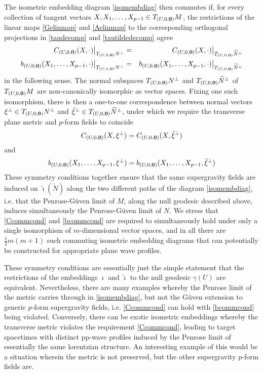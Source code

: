 The isometric embedding diagram \eqref{isomembdiag} then commutes if, for every
collection of tangent vectors $X,X_1,\dots,X_{p-1}\in T_{(U,0,{\boldsymbol {0} })}M$, the
restrictions of the linear maps \eqref{Gelinmap} and \eqref{Aelinmap} to the
corresponding orthogonal projections in \eqref{taudecomp} and
\eqref{tautildedecomp} agree
\begin{eqnarray}
  \label{Ccommcond}
  \bigl.C_{(U,0,{\boldsymbol {0} })}(X,\cdot)\bigr|_{T_{(U,0,{\boldsymbol {0} })}N^\perp}&=&
  \bigl.C_{(U,0,{\boldsymbol {0} })}(X,\cdot)\bigr|_{T_{(U,0,{\boldsymbol {0} })}
    \widetilde{N}^{\perp}} \\
  \label{bcommcond}
  \bigl.b_{(U,0,{\boldsymbol {0} })}(X_1,\ldots,X_{p-1},\cdot)
  \bigr|_{T_{(U,0,{\boldsymbol {0} })}N^\perp}&=&
  \bigl.b_{(U,0,{\boldsymbol {0} })}(X_1,\ldots,X_{p-1},\cdot)\bigr|_{T_{(U,0,{\boldsymbol {0} })}
    \widetilde{N}^{\perp}}
\end{eqnarray}
in the following sense. The normal subspaces $T_{(U,0,{\boldsymbol {0} })}N^\perp$ and
$T_{(U,0,{\boldsymbol {0} })}\widetilde{N}^{\perp}$ of $T_{(U,0,{\boldsymbol {0} })}M$ are non-canonically
isomorphic as vector spaces. Fixing one such isomorphism, there is then a
one-to-one correspondence between normal vectors $\xi^\perp\in
T_{(U,0,{\boldsymbol {0} })}N^\perp$ and $\tilde\xi^\perp\in
T_{(U,0,{\boldsymbol {0} })}\widetilde{N}^{\perp}$, under which we require the transverse
plane metric and $p$-form fields to coincide
\begin{equation*}
  C_{(U,0,{\boldsymbol {0} })}(X,\xi^\perp)=C_{(U,0,{\boldsymbol {0} })}(X,\tilde\xi^\perp)  
\end{equation*}
and
\begin{equation*}
  b_{(U,0,{\boldsymbol {0} })}(X_1,\ldots,X_{p-1},\xi^\perp)=b_{(U,0,{\boldsymbol {0} })} (X_1,\ldots,X_{p-1},\tilde\xi^\perp)
\end{equation*}
These symmetry conditions together ensure that the same supergravity fields are
induced on $\widetilde{\imath}(\widetilde{N})$ along the two different paths of
the diagram \eqref{isomembdiag}, i.e. that the Penrose-G\"uven limit of $M$,
along the null geodesic described above, induces simultaneously the
Penrose-G\"uven limit of $N$. We stress that \eqref{Ccommcond} and
\eqref{bcommcond} are required to simultaneously hold under only a single
isomorphism of $m$-dimensional vector spaces, and in all there are
$\frac12m(m+1)$ such commuting isometric embedding diagrams that can potentially
be constructed for appropriate plane wave profiles.

These symmetry conditions are essentially just the simple statement that the
restrictions of the embeddings $\imath$ and $\widetilde{\imath}$ to the null
geodesic $\gamma(U)$ are equivalent. Nevertheless, there are many examples
whereby the Penrose limit of the metric carries through in \eqref{isomembdiag},
but not the G\"uven extension to generic $p$-form supergravity fields, i.e.
\eqref{Ccommcond} can hold with \eqref{bcommcond} being violated. Conversely,
there can be exotic isometric embeddings whereby the transverse metric violates
the requirement \eqref{Ccommcond}, leading to target spacetimes with distinct
pp-wave profiles induced by the Penrose limit of essentially the same lorentzian
structure. An interesting example of this would be a situation wherein the
metric is not preserved, but the other supergravity $p$-form fields are.

